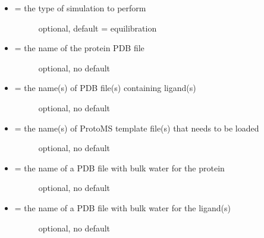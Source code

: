 \documentclass[letterpaper,10pt,english]{sphinxmanual}
\begin{document}
\begin{itemize}
\item {} \begin{description}
\item[{ = the type of simulation to perform}] \leavevmode
optional, default = equilibration

\end{description}

\item {} \begin{description}
\item[{ = the name of the protein PDB file}] \leavevmode
optional, no default

\end{description}

\item {} \begin{description}
\item[{ = the name(s) of PDB file(s) containing ligand(s)}] \leavevmode
optional, no default

\end{description}

\item {} \begin{description}
\item[{ = the name(s) of ProtoMS template file(s) that needs to be loaded}] \leavevmode
optional, no default

\end{description}

\item {} \begin{description}
\item[{ = the name of a PDB file with bulk water for the protein}] \leavevmode
optional, no default

\end{description}

\item {} \begin{description}
\item[{ = the name of a PDB file with bulk water for the ligand(s)}] \leavevmode
optional, no default

\end{description}


\end{itemize}
\end{document}
